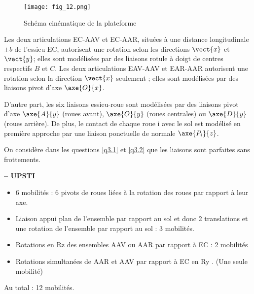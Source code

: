 \begin{figure}[H]
\centering
\texttt{[image: fig\_12.png]}
\caption{Schéma cinématique de la plateforme\label{fig_12}}
\end{figure}

Les deux articulations EC-AAV et EC-AAR, situées à une distance longitudinale $\pm b$ de l'essieu
EC, autorisent une rotation selon les directions $\vect{x}$ et $\vect{y}$; elles sont modélisées par des liaisons
rotule à doigt de centres respectifs $B$ et $C$. Les deux articulations EAV-AAV et EAR-AAR
autorisent une rotation selon la direction $\vect{x}$ seulement ; elles sont modélisées par des liaisons
pivot d'axe $\axe{O}{x}$.

D'autre part, les six liaisons essieu-roue sont modélisées par des liaisons pivot d'axe $\axe{A}{y}$
(roues avant), $\axe{O}{y}$ (roues centrales) ou $\axe{D}{y}$ (roues arrière). De plus, le contact de chaque
roue i avec le sol est modélisé en première approche par une liaison ponctuelle de normale
$\axe{P_i}{z}$.

On considère dans les questions \ref{q3.1} et \ref{q3.2} que les liaisons sont parfaites sans frottements.

\fi

\ifprof
\begin{corrige}\textbf{ -- UPSTI}\\ 
\vspace{-.7cm}
\begin{itemize}
\item 6 mobilités : 6 pivots de roues liées à la rotation des roues par rapport à leur axe.
\item Liaison appui plan de l’ensemble par rapport au sol et donc 2 translations et une rotation de l’ensemble par rapport au sol : 3 mobilités.
\item Rotations en Rz des ensembles AAV ou AAR par rapport à EC : 2 mobilités
\item Rotations simultanées de AAR et AAV par rapport à EC en Ry . (Une seule mobilité)
\end{itemize}
Au total : 12 mobilités. 
\end{corrige}
\else
\fi

